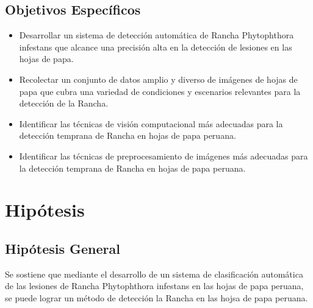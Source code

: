 \subsection{Objetivos Espec\'{i}ficos}
\newcommand{\Objone}{
	Desarrollar un sistema de detección automática de Rancha Phytophthora infestans que alcance una precisión alta en la detección de lesiones en las hojas de papa.
}
\newcommand{\Objtwo}{
	Recolectar un conjunto de datos amplio y diverso de imágenes de hojas de papa que cubra una variedad de condiciones y escenarios relevantes para la detección de la Rancha.
}
\newcommand{\Objthree}{
	Identificar las técnicas de visión computacional más adecuadas para la detección temprana de Rancha en hojas de papa peruana.
}
\newcommand{\Objfour}{
	Identificar las técnicas de preprocesamiento de imágenes más adecuadas para la detección temprana de Rancha en hojas de papa peruana.
}

\begin{itemize}
	\item {\Objone}
	\item {\Objtwo}
	\item {\Objthree}
	\item {\Objfour}
\end{itemize}

\section{Hipótesis}

\subsection{Hipótesis General}
\newcommand{\HipotesisGeneral}{
	Se sostiene que mediante el desarrollo de un sistema de clasificación automática de las lesiones de Rancha Phytophthora infestans en las hojas de papa peruana, se puede lograr un método de detección la Rancha en las hojsa de papa peruana.
}
\HipotesisGeneral
